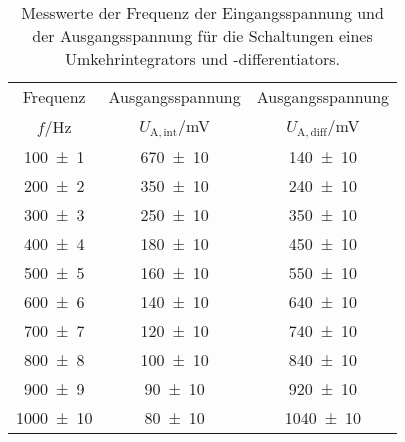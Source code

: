 \begin{table}[!h]
	\centering
	\begin{tabular}{ccc}
		\toprule
		Frequenz & Ausgangsspannung & Ausgangsspannung\\
		$f$/\si{\hertz} & $U_{\mathrm{A},\mathrm{int}}$/\si{\milli\volt} & $U_{\mathrm{A},\mathrm{diff}}$/\si{\milli\volt}\\
\midrule
		\num{100(1)} & \num{670(10)} & \num{140(10)}\\
		\num{200(2)} & \num{350(10)} & \num{240(10)}\\
		\num{300(3)} & \num{250(10)} & \num{350(10)}\\
		\num{400(4)} & \num{180(10)} & \num{450(10)}\\
		\num{500(5)} & \num{160(10)} & \num{550(10)}\\
		\num{600(6)} & \num{140(10)} & \num{640(10)}\\
		\num{700(7)} & \num{120(10)} & \num{740(10)}\\
		\num{800(8)} & \num{100(10)} & \num{840(10)}\\
		\num{900(9)} & \num{90(10)} & \num{920(10)}\\
		\num{1000(10)} & \num{80(10)} & \num{1040(10)}\\
		\bottomrule
	\end{tabular}
	\caption{ Messwerte der Frequenz der Eingangsspannung und der Ausgangsspannung für die Schaltungen eines Umkehrintegrators und -differentiators. \label{tab:integrator_differentiator}}
\end{table}
